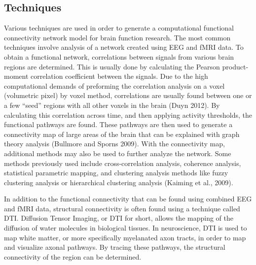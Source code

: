 \documentclass[11pt,letterpaper,doublespacing,titlepage]{article}
\begin{document}

\subsection{Techniques}
\par
Various techniques are used in order to generate a computational functional connectivity network model for brain function research.  The most common techniques involve analysis of a network created using EEG and fMRI data. To obtain a functional network, correlations between signals from various brain regions are determined. This is usually done by calculating the Pearson product-moment correlation coefficient between the signals. Due to the high computational demands of preforming the correlation analysis on a voxel (volumetric pixel) by voxel method, correlations are usually found between one or a few “seed” regions with all other voxels in the brain (Duyn 2012). By calculating this correlation across time, and then applying activity thresholds, the functional pathways are found. These pathways are then used to generate a connectivity map of large areas of the brain that can be explained with graph theory analysis (Bullmore and Sporns 2009).  With the connectivity map, additional methods may also be used to further analyze the network. Some methods previously used include cross-correlation analysis, coherence analysis, statistical parametric mapping, and clustering analysis methods like fuzzy clustering analysis or hierarchical clustering analysis (Kaiming et al., 2009).
\par
In addition to the functional connectivity that can be found using combined EEG and fMRI data, structural connectivity is often found using a technique called DTI. Diffusion Tensor Imaging, or DTI for short, allows the mapping of the diffusion of water molecules in biological tissues. In neuroscience, DTI is used to map white matter, or more specifically myelanated axon tracts, in order to map and visualize axonal pathways. By tracing these pathways, the structural connectivity of the region can be determined.

\end{document}
